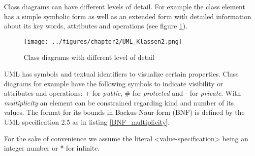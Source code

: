 \documentclass[twoside, openright, 12pt]{book}
\begin{document}
\noindent 
Class diagrams can have different levels of detail.
For example the class element has a simple symbolic form as well as an extended form with detailed information about its key words, attributes and operations (see figure \ref{fig:Class}).

\begin{figure}[htb]
	\centering
	\texttt{[image: ../figures/chapter2/UML\_Klassen2.png]}
	\caption{Class diagrams with different level of detail}
	\label{fig:Class}
\end{figure}
 
\noindent 
UML has symbols and textual identifiers to visualize certain properties.
Class diagrams for example have the following symbols to indicate visibility or attributes and operations: + for \textit{public}, \# for \textit{protected} and - for \textit{private}.
With \textit{multiplicity} an element can be constrained regarding kind and number of its values.
The format for its bounds in Backus-Naur form (BNF) is defined by the UML specification 2.5 \citep{UML_OMG} as in listing \ref{BNF_multiplicity}.

\setlength{\grammarparsep}{10pt plus 1pt minus 1pt} %
\setlength{\grammarindent}{13em} %

\vspace{0.4cm}
\noindent
\begin{BNF}
\caption{UML multiplicity syntax in BNF}
\label{BNF_multiplicity}
\end{BNF}
\vspace{0.3cm}

\noindent
For the sake of convenience we assume the literal <value-specification> being an integer number or * for infinite.
\end{document}
